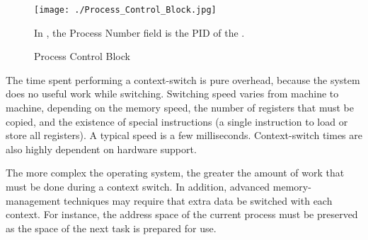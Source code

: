\begin{figure}[h!tbp]
  \centering
  \texttt{[image: ./Process\_Control\_Block.jpg]}
  \caption{Process Control Block}
  \label{fig:Process_Control_Block}
  \begin{remark*}
    In , the Process Number field is the PID of the .
  \end{remark*}
\end{figure}

The time spent performing a context-switch is pure overhead, because the system does no useful work while switching.
Switching speed varies from machine to machine, depending on the memory speed, the number of registers that must be copied, and the existence of special instructions (a single instruction to load or store all registers).
A typical speed is a few milliseconds.
Context-switch times are also highly dependent on hardware support.

The more complex the operating system, the greater the amount of work that must be done during a context switch.
In addition, advanced memory-management techniques may require that extra data be switched with each context.
For instance, the address space of the current process must be preserved as the space of the next task is prepared for use.

